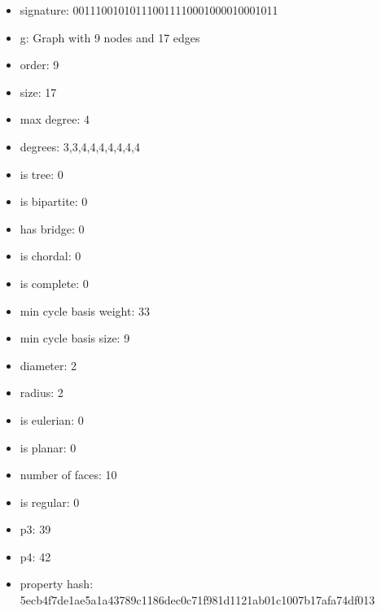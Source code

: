 \newpage
\begin{figure}
\end{figure}
\begin{itemize}
\item signature: 001110010101110011110001000010001011
\item g: Graph with 9 nodes and 17 edges
\item order: 9
\item size: 17
\item max degree: 4
\item degrees: 3,3,4,4,4,4,4,4,4
\item is tree: 0
\item is bipartite: 0
\item has bridge: 0
\item is chordal: 0
\item is complete: 0
\item min cycle basis weight: 33
\item min cycle basis size: 9
\item diameter: 2
\item radius: 2
\item is eulerian: 0
\item is planar: 0
\item number of faces: 10
\item is regular: 0
\item p3: 39
\item p4: 42
\item property hash: 5ecb4f7de1ae5a1a43789c1186dec0c71f981d1121ab01c1007b17afa74df013
\end{itemize}
